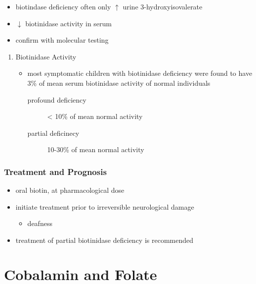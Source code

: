 \documentclass{scrartcl}
\begin{document}
\begin{itemize}
\item biotindase deficiency often only \(\uparrow\) urine 3-hydroxyisovalerate
\item \(\downarrow\) biotinidase activity in serum
\item confirm with molecular testing
\end{itemize}

\begin{enumerate}
\item Biotinidase Activity
\label{sec:orgfea35f6}
\begin{itemize}
\item most symptomatic children with biotinidase deficiency were found to
have 3\% of mean serum biotinidase activity of normal individuals
\begin{description}
\item[{profound deficiency}] \textless{} 10\% of mean normal activity
\item[{partial deficinecy}] 10-30\% of mean normal activity
\end{description}
\end{itemize}
\end{enumerate}

\subsubsection{Treatment and Prognosis}
\label{sec:org4a2a127}
\begin{itemize}
\item oral biotin, at pharmacological dose
\item initiate treatment prior to irreversible neurological damage
\begin{itemize}
\item deafness
\end{itemize}
\item treatment of partial biotinidase deficiency is recommended
\end{itemize}

\section{Cobalamin and Folate}
\label{sec:orgee1f2fd}
\end{document}
